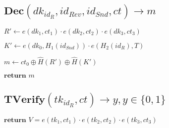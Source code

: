 \documentclass[a4paper]{article}
\begin{document}
\subsection{$\textbf{Dec}(\textit{dk}_{\textit{id}_R}, \textit{id}_\textit{Rev}, \textit{id}_\textit{Snd}, \textit{ct}) \rightarrow m$}

$R' \gets e(\textit{dk}_1, \textit{ct}_1) \cdot e(\textit{dk}_2, \textit{ct}_2) \cdot e(\textit{dk}_3, \textit{ct}_3)$

$K' \gets e(\textit{dk}_0, H_1(\textit{id}_\textit{Snd})) \cdot e(H_2(\textit{id}_R), T)$

$m \gets \textit{ct}_0 \oplus \hat{H}(R') \oplus \hat{H}(K')$

$\textbf{return }m$

\subsection{$\textbf{TVerify}(\textit{tk}_{\textit{id}_R}, \textit{ct}) \rightarrow y, y \in \{0, 1\}$}

$\textbf{return }V = e(\textit{tk}_1, \textit{ct}_1) \cdot e(\textit{tk}_2, \textit{ct}_2) \cdot e(\textit{tk}_3, \textit{ct}_3)$
\end{document}
